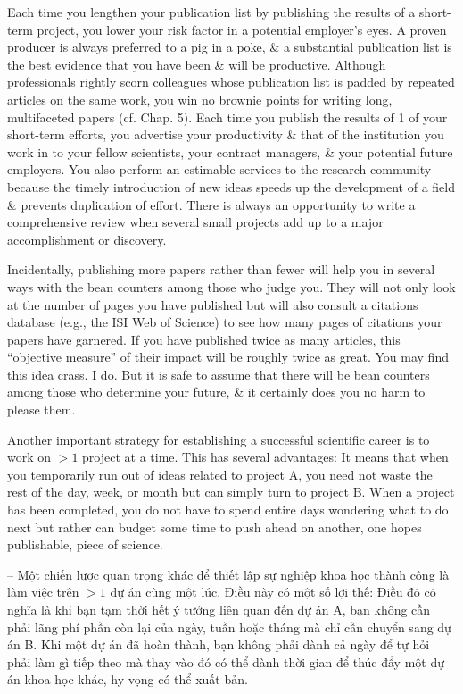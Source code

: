 \documentclass{article}
\begin{document}
\begin{enumerate}
\begin{itemize}
\begin{itemize}
			Each time you lengthen your publication list by publishing the results of a short-term project, you lower your risk factor in a potential employer's eyes. A proven producer is always preferred to a pig in a poke, \& a substantial publication list is the best evidence that you have been \& will be productive. Although professionals rightly scorn colleagues whose publication list is padded by repeated articles on the same work, you win no brownie points for writing long, multifaceted papers (cf. Chap. 5). Each time you publish the results of 1 of your short-term efforts, you advertise your productivity \& that of the institution you work in to your fellow scientists, your contract managers, \& your potential future employers. You also perform an estimable services to the research community because the timely introduction of new ideas speeds up the development of a field \& prevents duplication of effort. There is always an opportunity to write a comprehensive review when several small projects add up to a major accomplishment or discovery.
			
			Incidentally, publishing more papers rather than fewer will help you in several ways with the bean counters among those who judge you. They will not only look at the number of pages you have published but will also consult a citations database (e.g., the ISI Web of Science) to see how many pages of citations your papers have garnered. If you have published twice as many articles, this ``objective measure'' of their impact will be roughly twice as great. You may find this idea crass. I do. But it is safe to assume that there will be bean counters among those who determine your future, \& it certainly does you no harm to please them.
			
			Another important strategy for establishing a successful scientific career is to work on $> 1$ project at a time. This has several advantages: It means that when you temporarily run out of ideas related to project A, you need not waste the rest of the day, week, or month but can simply turn to project B. When a project has been completed, you do not have to spend entire days wondering what to do next but rather can budget some time to push ahead on another, one hopes publishable, piece of science.
			
			-- Một chiến lược quan trọng khác để thiết lập sự nghiệp khoa học thành công là làm việc trên $> 1$ dự án cùng một lúc. Điều này có một số lợi thế: Điều đó có nghĩa là khi bạn tạm thời hết ý tưởng liên quan đến dự án A, bạn không cần phải lãng phí phần còn lại của ngày, tuần hoặc tháng mà chỉ cần chuyển sang dự án B. Khi một dự án đã hoàn thành, bạn không phải dành cả ngày để tự hỏi phải làm gì tiếp theo mà thay vào đó có thể dành thời gian để thúc đẩy một dự án khoa học khác, hy vọng có thể xuất bản.
			

\end{itemize}
\end{itemize}
\end{enumerate}
\end{document}
